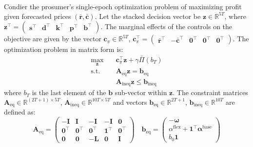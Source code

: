 \documentclass[12pt, notitlepage]{article}
\begin{document}
Condier the prosumer's single-epoch optimization problem of maximizing profit given forecasted prices $(\bar{\mathbf{r}}, \bar{\mathbf{c}})$.  Let the stacked decision vector be $\mathbf{z} \in \mathbb{R}^{5T}$, where $\mathbf{z}^\top = \begin{pmatrix} \mathbf{s}^\top & \mathbf{d}^\top & \mathbf{k}^\top & \mathbf{p}^\top & \mathbf{b}^\top \end{pmatrix}$. The marginal effects of the controls on the objective are given by the vector $\mathbf{c}_{\pi} \in \mathbb{R}^{5T}$, $\mathbf{c}_{\pi}^\top = \begin{pmatrix} \bar{\mathbf{r}}^\top & -\bar{\mathbf{c}}^\top & \mathbf{0}^\top & \mathbf{0}^\top & \mathbf{0}^\top \end{pmatrix}$. The optimization problem in matrix form is:
\begin{align*}
\max_{\mathbf{z}} \quad & \mathbf{c}_{\pi}^\top \mathbf{z}  + \gamma \bar{\Pi}(b_T) \\
\text{s.t.} \quad & \mathbf{A}_{\text{eq}} \mathbf{z} = \mathbf{b}_{\text{eq}} \\
& \mathbf{A}_{\text{ineq}} \mathbf{z} \le \mathbf{b}_{\text{ineq}}
\end{align*}
where $b_T$ is the last element of the $\mathbf{b}$ sub-vector within $\mathbf{z}$. The constraint matrices $\mathbf{A}_{\text{eq}} \in \mathbb{R}^{(2T+1) \times 5T}$, $\mathbf{A}_{\text{ineq}} \in \mathbb{R}^{10T \times 5T}$ and vectors $\mathbf{b}_{\text{eq}} \in \mathbb{R}^{2T+1}$, $\mathbf{b}_{\text{ineq}} \in \mathbb{R}^{10T}$ are defined as:
\[
\mathbf{A}_{\text{eq}} =
\begin{pmatrix}
-\mathbf{I} & \mathbf{I} & -\mathbf{I} & -\mathbf{I} & \mathbf{0} \\  %
\mathbf{0}^\top & \mathbf{0}^\top & \mathbf{0}^\top & \mathbf{1}^\top & \mathbf{0}^\top \\ %
\mathbf{0} & \mathbf{0} & -\mathbf{L} & \mathbf{0} & \mathbf{I} %
\end{pmatrix}
\quad
\mathbf{b}_{\text{eq}} =
\begin{pmatrix}
-\boldsymbol{\omega} \\
\alpha^{\text{flex}} + \mathbf{1}^\top \boldsymbol{\alpha}^{\text{base}} \\
b_0 \mathbf{1}
\end{pmatrix}
\]
\end{document}
